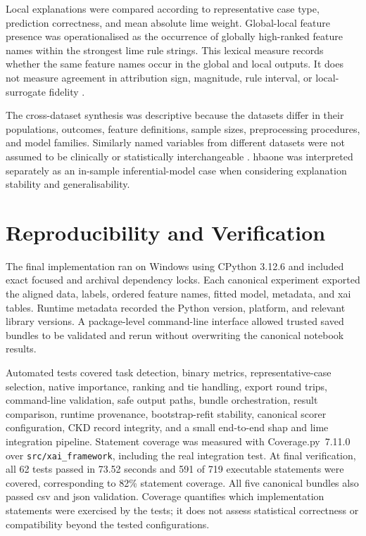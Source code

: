Local explanations were compared according to representative case type, prediction correctness, and mean absolute \gls{lime} weight. Global-local feature presence was operationalised as the occurrence of globally high-ranked feature names within the strongest \gls{lime} rule strings. This lexical measure records whether the same feature names occur in the global and local outputs. It does not measure agreement in attribution sign, magnitude, rule interval, or local-surrogate fidelity \citep{ribeiro_why_2016, vilone_classification_2021}.

The cross-dataset synthesis was descriptive because the datasets differ in their populations, outcomes, feature definitions, sample sizes, preprocessing procedures, and model families. Similarly named variables from different datasets were not assumed to be clinically or statistically interchangeable \citep{moons_probastai_2025}. \gls{hbaone} was interpreted separately as an in-sample inferential-model case when considering explanation stability and generalisability.

\section{Reproducibility and Verification}

The final implementation ran on Windows using CPython 3.12.6 and included exact focused and archival dependency locks. Each canonical experiment exported the aligned data, labels, ordered feature names, fitted model, metadata, and \gls{xai} tables. Runtime metadata recorded the Python version, platform, and relevant library versions. A package-level command-line interface allowed trusted saved bundles to be validated and rerun without overwriting the canonical notebook results.

Automated tests covered task detection, binary metrics, representative-case selection, native importance, ranking and tie handling, export round trips, command-line validation, safe output paths, bundle orchestration, result comparison, runtime provenance, bootstrap-refit stability, canonical scorer configuration, CKD record integrity, and a small end-to-end \gls{shap} and \gls{lime} integration pipeline. Statement coverage was measured with Coverage.py~7.11.0 over \texttt{src/xai\_framework}, including the real integration test. At final verification, all 62 tests passed in 73.52 seconds and 591 of 719 executable statements were covered, corresponding to 82\% statement coverage. All five canonical bundles also passed \gls{csv} and \gls{json} validation. Coverage quantifies which implementation statements were exercised by the tests; it does not assess statistical correctness or compatibility beyond the tested configurations.

